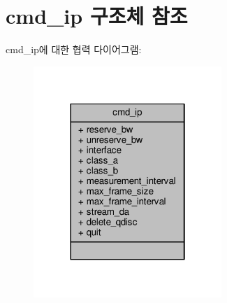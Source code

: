 \hypertarget{structcmd__ip}{}\section{cmd\+\_\+ip 구조체 참조}
\label{structcmd__ip}


cmd\+\_\+ip에 대한 협력 다이어그램\+:
\nopagebreak
\begin{figure}[H]
\begin{center}
\leavevmode
\includegraphics[width=202pt]{structcmd__ip__coll__graph}
\end{center}
\end{figure}
